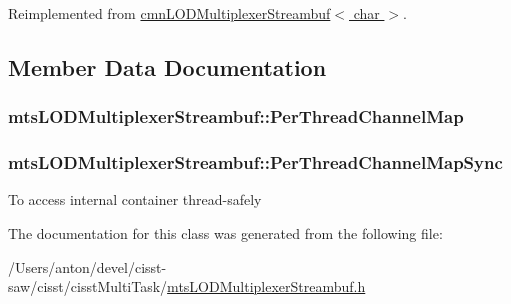 Reimplemented from \hyperlink{classcmn_l_o_d_multiplexer_streambuf_a143dfb4f86ab7f7b5e29bde48fae4bba}{cmn\+L\+O\+D\+Multiplexer\+Streambuf$<$ char $>$}.



\subsection{Member Data Documentation}
\hypertarget{classmts_l_o_d_multiplexer_streambuf_af30117fcef2a05140848f7ca2678d87b}{}
\subsubsection[{Per\+Thread\+Channel\+Map}]{ mts\+L\+O\+D\+Multiplexer\+Streambuf\+::\+Per\+Thread\+Channel\+Map\hspace{0.3cm}{\ttfamily [protected]}}\label{classmts_l_o_d_multiplexer_streambuf_af30117fcef2a05140848f7ca2678d87b}
\hypertarget{classmts_l_o_d_multiplexer_streambuf_a9a3e813b12e3041f208b89134af18cd5}{}
\subsubsection[{Per\+Thread\+Channel\+Map\+Sync}]{ mts\+L\+O\+D\+Multiplexer\+Streambuf\+::\+Per\+Thread\+Channel\+Map\+Sync\hspace{0.3cm}{\ttfamily [protected]}}\label{classmts_l_o_d_multiplexer_streambuf_a9a3e813b12e3041f208b89134af18cd5}
To access internal container thread-\/safely 

The documentation for this class was generated from the following file\+:\begin{DoxyCompactItemize}
\item 
/\+Users/anton/devel/cisst-\/saw/cisst/cisst\+Multi\+Task/\hyperlink{mts_l_o_d_multiplexer_streambuf_8h}{mts\+L\+O\+D\+Multiplexer\+Streambuf.\+h}\end{DoxyCompactItemize}
